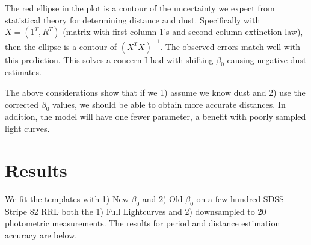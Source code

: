 \documentclass[12pt]{article}
\begin{document}
The red ellipse in the plot is a contour of the uncertainty we expect from statistical theory for determining distance and dust. Specifically with $X = (1^T,R^T)$ (matrix with first column 1's and second column extinction law), then the ellipse is a contour of $(X^TX)^{-1}$. The observed errors match well with this prediction. This solves a concern I had with shifting $\beta_0$ causing negative dust estimates.

The above considerations show that if we 1) assume we know dust and 2) use the corrected $\beta_0$ values, we should be able to obtain more accurate distances. In addition, the model will have one fewer parameter, a benefit with poorly sampled light curves.


\section{Results}

We fit the templates with 1) New $\beta_0$ and 2) Old $\beta_0$ on a few hundred SDSS Stripe 82 RRL both the 1) Full Lightcurves and 2) downsampled to 20 photometric measurements. The results for period and distance estimation accuracy are below.





%
%
\end{document}
